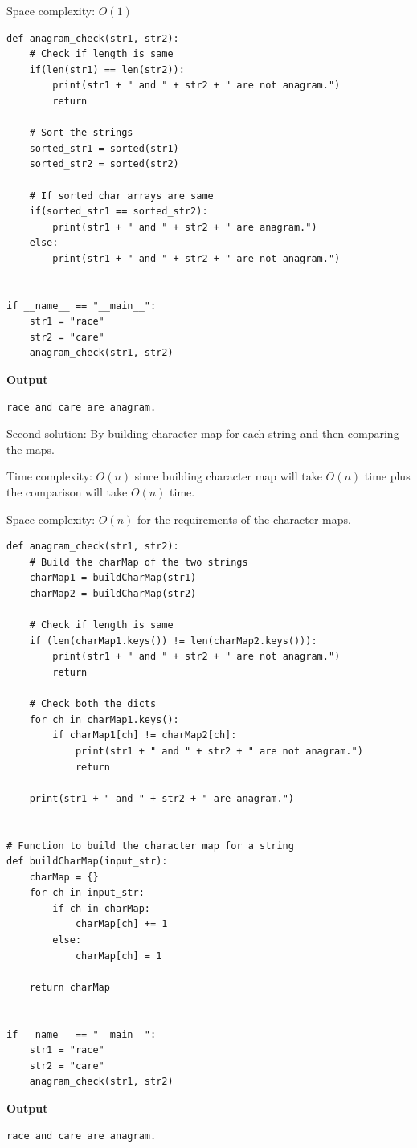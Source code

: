 \documentclass[a4paper,11pt]{book}
\begin{document}
\noindent Space complexity: $O(1)$
\begin{lstlisting}
def anagram_check(str1, str2):
    # Check if length is same
    if(len(str1) == len(str2)):
        print(str1 + " and " + str2 + " are not anagram.")
        return

    # Sort the strings
    sorted_str1 = sorted(str1)
    sorted_str2 = sorted(str2)

    # If sorted char arrays are same
    if(sorted_str1 == sorted_str2):
        print(str1 + " and " + str2 + " are anagram.")
    else:
        print(str1 + " and " + str2 + " are not anagram.")


if __name__ == "__main__":
    str1 = "race"
    str2 = "care"
    anagram_check(str1, str2)
\end{lstlisting}
\textbf{Output}
\begin{lstlisting}
race and care are anagram.
\end{lstlisting}

\noindent Second solution: By building character map for each string and then comparing the maps.

\noindent Time complexity:  $O(n)$ since building character map will take  $O(n)$ time plus the comparison will take $O(n)$ time.

\noindent Space complexity: $O(n)$ for the requirements of the character maps.
\begin{lstlisting}
def anagram_check(str1, str2):
    # Build the charMap of the two strings
    charMap1 = buildCharMap(str1)
    charMap2 = buildCharMap(str2)

    # Check if length is same
    if (len(charMap1.keys()) != len(charMap2.keys())):
        print(str1 + " and " + str2 + " are not anagram.")
        return

    # Check both the dicts
    for ch in charMap1.keys():
        if charMap1[ch] != charMap2[ch]:
            print(str1 + " and " + str2 + " are not anagram.")
            return

    print(str1 + " and " + str2 + " are anagram.")


# Function to build the character map for a string
def buildCharMap(input_str):
    charMap = {}
    for ch in input_str:
        if ch in charMap:
            charMap[ch] += 1
        else:
            charMap[ch] = 1

    return charMap


if __name__ == "__main__":
    str1 = "race"
    str2 = "care"
    anagram_check(str1, str2)
\end{lstlisting}
\textbf{Output}
\begin{lstlisting}
race and care are anagram.
\end{lstlisting}
\end{document}
